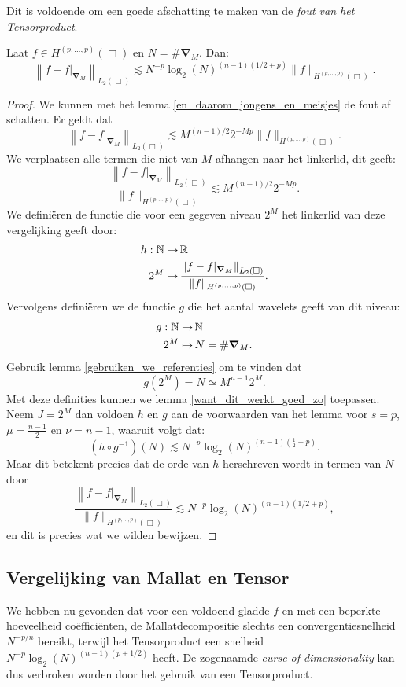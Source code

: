 Dit is voldoende om een goede afschatting te maken van de \emph{fout van het Tensorproduct}.
\begin{stelling}
\label{thm:fouttensor}
  Laat $f \in H^{(p,\ldots,p)}(\Box)$ en $N = \#\boldsymbol{\nabla}_M$. Dan:
  \[
  \left\| f - f|_{\boldsymbol\nabla_M} \right\|_{L_2(\Box)} \lesssim N^{-p} \log_2(N)^{(n-1)(1/2 + p)} \| f \|_{H^{(p,\ldots,p)}(\Box)}.
  \]
\end{stelling}
\begin{proof}
  We kunnen met het lemma \ref{en_daarom_jongens_en_meisjes} de fout af schatten. Er geldt dat
  \[
  \left\| f - f|_{\boldsymbol\nabla_M} \right\|_{L_2(\Box)} \lesssim M^{(n-1)/2}2^{-Mp}\| f \|_{H^{(p,\ldots,p)}(\Box)}.
  \]
  We verplaatsen alle termen die niet van $M$ afhangen naar het linkerlid, dit geeft:
  \[
  \frac{\left\| f - f|_{\boldsymbol\nabla_M}  \right\|_{L_2(\Box)}}{\| f \|_{H^{(p,\ldots,p)}(\Box)}} \lesssim M^{(n-1)/2}2^{-Mp}.
  \]
  We defini\"eren de functie die voor een gegeven niveau $2^M$ 
  het linkerlid van deze vergelijking geeft door:
  \[
  \begin{split}
    h: \mathbb{N} \to&\, \mathbb{R} \\
    2^M \mapsto&\, \frac{\left\| f - f|_{\boldsymbol\nabla_M}  \right\|_{L_2(\Box)}}{\| f \|_{H^{(p,\ldots,p)}(\Box)}}.
  \end{split}
  \]
  Vervolgens defini\"eren we de functie $g$ die het aantal wavelets geeft van dit niveau:
  \[
  \begin{split}
    g: \mathbb{N} \to&\, \mathbb{N}\\
    2^M \mapsto&\, N = \#\boldsymbol{\nabla}_M.
  \end{split}
  \]
  Gebruik lemma \ref{gebruiken_we_referenties} om te vinden dat 
  \[
  g(2^M) = N \simeq M^{n-1}2^M.
  \]
  Met deze definities kunnen we lemma \ref{want_dit_werkt_goed_zo} toepassen. Neem $J=2^M$
  dan voldoen $h$ en $g$ aan de voorwaarden van het lemma voor $s=p$, $\mu=\tfrac{n-1}{2}$ en $\nu=n-1$,
  waaruit volgt dat:
  \[
    (h \circ g^{-1})(N) \lesssim N^{-p} \log_2(N)^{(n-1)\left(\tfrac12 + p\right)}. 
  \]
  Maar dit betekent precies dat de orde van $h$ herschreven wordt in termen van $N$ door
  \[
  \frac{\left\| f - f|_{\boldsymbol\nabla_M} \right\|_{L_2(\Box)}}{\| f \|_{H^{(p,\ldots,p)}(\Box)}}
  \lesssim N^{-p} \log_2(N)^{(n-1)(1/2 + p)}, 
  \]
  en dit is precies wat we wilden bewijzen.
\end{proof}

\subsection{Vergelijking van Mallat en Tensor}
We hebben nu gevonden dat voor een voldoend gladde $f$ en met een beperkte hoeveelheid co\"effici\"enten, 
de Mallatdecompositie slechts een convergentiesnelheid $N^{-p/n}$ bereikt, 
terwijl het Tensorproduct een snelheid $N^{-p} \log_2(N)^{(n-1)(p+1/2)}$ heeft. 
De zogenaamde \emph{curse of dimensionality} kan dus verbroken worden door het gebruik van een Tensorproduct.

